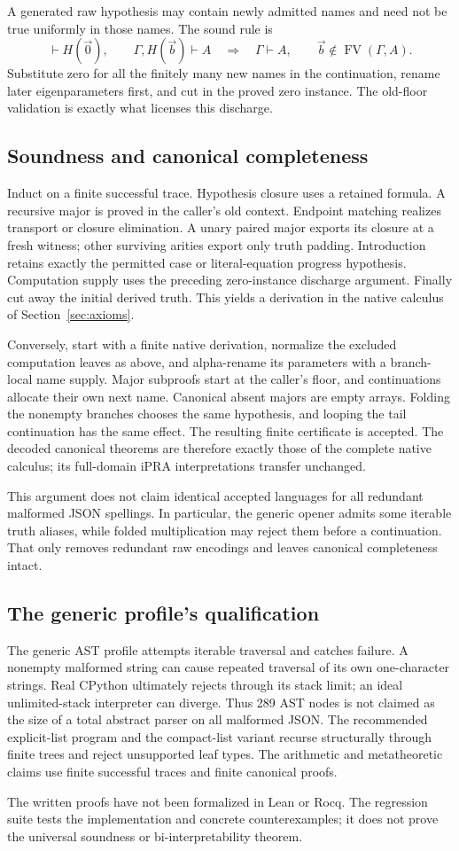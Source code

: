 A generated raw hypothesis may contain newly admitted names and need
not be true uniformly in those names. The sound rule is
\[
 \vdash H(\vec0),\qquad\Gamma,H(\vec b)\vdash A
 \quad\Longrightarrow\quad\Gamma\vdash A,
 \qquad\vec b\notin\operatorname{FV}(\Gamma,A).
\]
Substitute zero for all the finitely many new names in the continuation,
rename later eigenparameters first, and cut in the proved zero instance.
The old-floor validation is exactly what licenses this discharge.

\subsection{Soundness and canonical completeness}
Induct on a finite successful trace. Hypothesis closure uses a retained
formula. A recursive major is proved in the caller's old context.
Endpoint matching realizes transport or closure elimination. A unary
paired major exports its closure at a fresh witness; other surviving
arities export only truth padding. Introduction retains exactly the
permitted case or literal-equation progress hypothesis. Computation
supply uses the preceding zero-instance discharge argument. Finally
cut away the initial derived truth. This yields a derivation in the
native calculus of Section~\ref{sec:axioms}.

Conversely, start with a finite native derivation, normalize the
excluded computation leaves as above, and alpha-rename its parameters
with a branch-local name supply. Major subproofs start at the caller's
floor, and continuations allocate their own next name. Canonical absent
majors are empty arrays. Folding the nonempty branches chooses the same
hypothesis, and looping the tail continuation has the same effect.
The resulting finite certificate is accepted. The decoded canonical
theorems are therefore exactly those of the complete native calculus;
its full-domain iPRA interpretations transfer unchanged.

This argument does not claim identical accepted languages for all
redundant malformed JSON spellings. In particular, the generic opener
admits some iterable truth aliases, while folded multiplication may
reject them before a continuation. That only removes redundant raw
encodings and leaves canonical completeness intact.

\subsection{The generic profile's qualification}
The generic AST profile attempts iterable traversal and catches failure.
A nonempty malformed string can cause repeated traversal of its own
one-character strings. Real CPython ultimately rejects through its
stack limit; an ideal unlimited-stack interpreter can diverge. Thus
289 AST nodes is not claimed as the size of a total abstract parser on
all malformed JSON. The recommended explicit-list program and the
compact-list variant recurse structurally through finite trees and
reject unsupported leaf types. The arithmetic and metatheoretic
claims use finite successful traces and finite canonical proofs.

The written proofs have not been formalized in Lean or Rocq. The
regression suite tests the implementation and concrete counterexamples;
it does not prove the universal soundness or bi-interpretability theorem.
